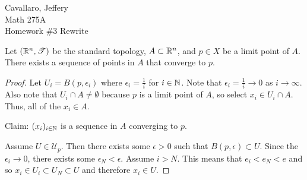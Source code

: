 \documentclass[letterpaper,12pt,fleqn]{article}
\newcommand{\T}{\mathscr{T}}
\newcommand{\U}{\mathcal{U}}
\newcommand{\e}{\epsilon}
\begin{document}
Cavallaro, Jeffery \\
Math 275A \\
Homework \#3 Rewrite

\bigskip

\begin{theorem}[2.31]
  Let \((\R^n,\T)\) be the standard topology, \(A\subset\mathbb{R}^n\), and \(p\in X\) be a limit point of \(A\).  There
  exists a sequence of points in \(A\) that converge to \(p\).
\end{theorem}

\begin{proof}
  Let \(U_i=B\left(p,\e_i\right)\) where \(\e_i=\frac{1}{i}\) for \(i\in\mathbb{N}\).  Note that \(\e_i=\frac{1}{i}\to0\)
  as \(i\to\infty\).  Also note that \(U_i\cap A\ne\emptyset\) because \(p\) is a limit point of \(A\), so select
  \(x_i\in U_i\cap A\).  Thus, all of the \(x_i\in A\).

  Claim: \((x_i)_{i\in\mathbb{N}}\) is a sequence in \(A\) converging to \(p\).

  Assume \(U\in\U_p\).  Then there exists some \(\e>0\) such that \(B(p,\e)\subset U\).  Since the \(\e_i\to0\),
  there exists some \(\e_N<\e\).  Assume \(i>N\).  This means that \(e_i<e_N<e\) and so
  \(x_i\in U_i\subset U_N\subset U\) and therefore \(x_i\in U\).
\end{proof}
\end{document}
